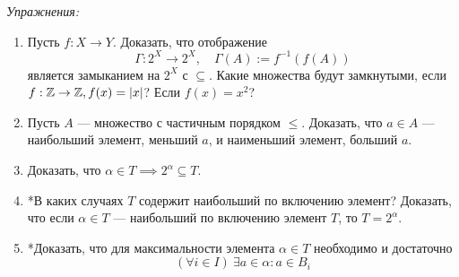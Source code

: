 \vspace{1em}
{\it Упражнения:}
\begin{enumerate}
	\item{}Пусть $f:X\to Y$. Доказать, что отображение
		\[
			\Gamma:2^{X}\to 2^{X},\quad \Gamma(A):= f^{-1}(f(A))
		\]
		является замыканием на $2^{X}$ с $\subseteq$. Какие множества
		будут замкнутыми, если $f:\mathbb Z\to \mathbb Z,f(x)=|x|$? Если $f(x)=x^{2}$?
	\item{}Пусть $A$ --- множество с частичным порядком $\leq$.
		Доказать, что $a\in A$ --- наибольший элемент, меньший $a$,
		и наименьший элемент, больший $a$.
	\item{}Доказать, что $\alpha\in T\implies 2^{\alpha}\subseteq T$.
	\item{}*В каких случаях $T$ содержит наибольший по включению элемент?
		Доказать, что если $\alpha\in T$ --- наибольший по включению элемент $T$,
		то $T=2^{\alpha}$.
	\item{}*Доказать, что для максимальности элемента $\alpha\in T$ необходимо
		и достаточно
		\[
			(\forall i\in I)~\exists a\in\alpha:a\in B_{i}
		\]
\end{enumerate}
